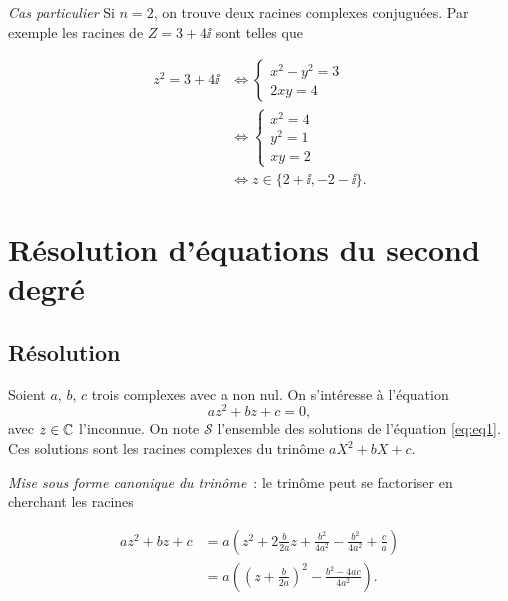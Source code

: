                       \emph{Cas particulier}
                      Si \(n = 2\), on trouve deux racines complexes conjuguées. Par exemple les 
                      racines de \(Z = 3 + 4\ii\) sont telles que

                      \begin{align*}
                        z^2 = 3 + 4\ii & \iff  \begin{cases} x^2-y^2 = 3 \\ 2xy = 4 \end{cases} \\
                                       & \iff \begin{cases} x^2 = 4 \\ y^2 = 1 \\ xy = 2 \end{cases} \\
                                       & \iff z \in \{2 + \ii, -2-\ii\}.
                      \end{align*}

                      \section{Résolution d'équations du second degré}
                      \label{sec:resolutionequationseconddegre}

                      \subsection{Résolution}
                      \label{subsec:resolution}

                      Soient \(a\), \(b\), \(c\) trois complexes avec a non nul. On s'intéresse à 
                      l'équation
                      \begin{equation}
                        \label{eq:eq1}
                        az^2 + bz + c = 0,
                      \end{equation}
                      avec \(z \in \mathbb{C}\) l'inconnue. On note \(\mathcal{S}\) l'ensemble des solutions 
                      de l'équation \eqref{eq:eq1}. Ces solutions sont les racines complexes du 
                      trinôme \(aX^2 + bX + c\).

                      \emph{Mise sous forme canonique du trinôme}~: le trinôme peut se factoriser en 
                      cherchant les racines

                      \begin{align*}
                        az^2 + bz + c & = a \left( z^2+ 2 \frac{b}{2a}z + \frac{b^2}{4a^2} - 
                        \frac{b^2}{4a^2}  + \frac{c}{a} \right) \\
                                      & = a \left( \left( z + \frac{b}{2a} \right)^2 - 
                                      \frac{b^2-4ac}{4a^2} \right).
                        \end{align*}

